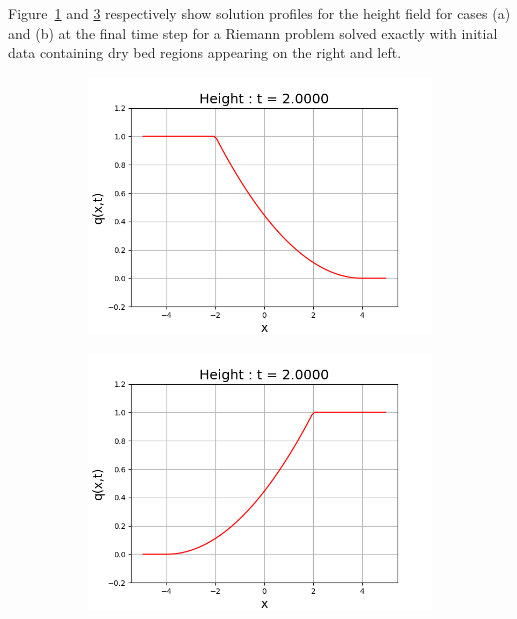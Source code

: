 \documentclass[12pt,a4paper]{article}
\begin{document}
{	
	Figure~\ref{fig:right} and \ref{fig:left} respectively show solution profiles for the height field for cases (a) and (b) at the final time step for a Riemann problem  solved exactly with initial data containing dry bed regions appearing on the right and left.
	\begin{figure}[H]
		\begin{subfigure}[b]{0.5\textwidth}
			\centering
			\includegraphics[width=1.0\linewidth]{images/right}
			\caption{}
			\label{fig:right}
		\end{subfigure}
		\begin{subfigure}[b]{0.5\textwidth}
			\centering
			\includegraphics[width=1.0\linewidth]{images/left}
			\caption{}
			\label{fig:left}

\end{subfigure}
\end{figure}}
\end{document}

